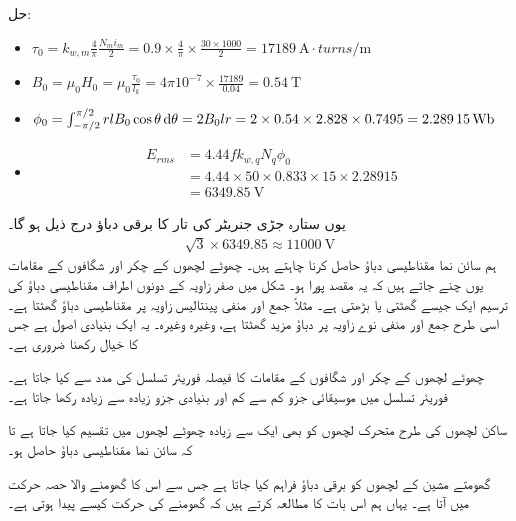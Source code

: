 حل:
\begin{itemize}
\item
\(
\tau_0=k_{w,m} \frac{4}{\pi}\frac{N_m i_m}{2}=0.9 \times \frac{4}{\pi} \times \frac{30 \times 1000}{2}=\SI{17189}{\ampere \cdot turns \per \meter}
\)
\item
\(
B_0=\mu_0 H_0=\mu_0 \frac{\tau_0}{l_k}=4 \pi 10^{-7} \times \frac{17189}{0.04}=\SI{0.54}{\tesla}
\)
\item
\(
\phi_0=\int_{-\pi/2}^{\pi/2}rl B_0\cos \theta \dif \theta=2 B_0 l r =2 \times 0.54 \times 2.828 \times 0.7495=\SI{2.28915}{\weber}
\)
\item
\begin{align*}
E_{rms}&=4.44 f k_{w,q} N_q \phi_0\\
&=4.44 \times 50 \times 0.833 \times 15 \times 2.28915\\
&=\SI{6349.85}{\volt} 
\end{align*}
\end{itemize}
یوں ستارہ جڑی جنریٹر کی تار کا برقی دباؤ درج ذیل ہو گا۔
\begin{align*}
\sqrt{3} \times 6349.85 \approx \SI{11000}{\volt}
\end{align*}
%
ہم  سائن نما مقناطیسی دباؤ حاصل کرنا چاہتے ہیں۔ چھوٹے لچھوں کے چکر اور شگافوں کے مقامات یوں چنے جاتے ہیں کہ یہ مقصد پورا ہو۔ شکل   میں  صفر زاویہ کے دونوں اطراف مقناطیسی دباؤ کی ترسیم ایک جیسے گھٹتی یا بڑھتی ہے۔ مثلاً جمع اور منفی  پینتالیس زاویہ پر مقناطیسی دباؤ    گھٹتا ہے۔ اسی طرح جمع اور منفی نوے زاویہ پر دباؤ مزید   گھٹتا ہے، وغیرہ وغیرہ۔ یہ ایک بنیادی اصول ہے جس کا خیال رکھنا ضروری ہے۔

چھوٹے لچھوں کے چکر اور شگافوں کے مقامات کا فیصلہ فوریئر تسلسل کی مدد سے کیا جاتا ہے۔فوریئر تسلسل میں موسیقائی جزو  کم سے کم اور بنیادی جزو  زیادہ سے زیادہ رکھا جاتا ہے۔

ساکن لچھوں کی طرح متحرک لچھوں کو بھی ایک سے زیادہ چھوٹے لچھوں میں تقسیم کیا جاتا ہے تا کہ سائن نما مقناطیسی دباؤ حاصل ہو۔

گھومتے مشین کے لچھوں کو برقی دباؤ فراہم کیا جاتا ہے جس سے اس کا گھومنے والا حصہ حرکت میں آتا ہے۔ یہاں ہم اس بات کا مطالعہ کرتے ہیں کہ گھومنے کی حرکت کیسے پیدا ہوتی ہے۔


